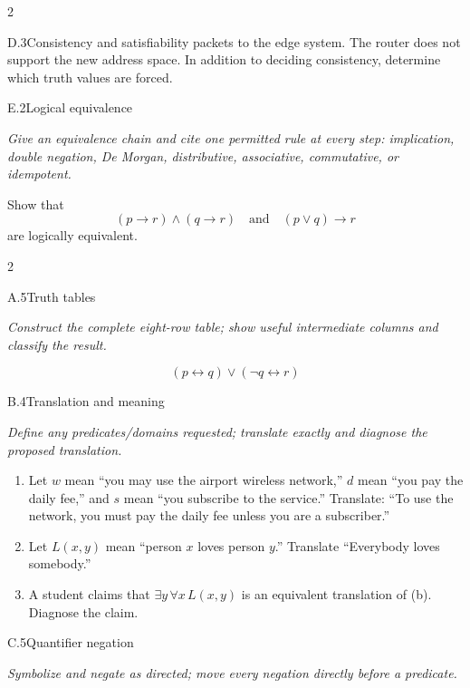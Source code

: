 \documentclass[9pt]{extarticle}
\begin{document}
\begin{multicols}{2}
\begin{CoreProblem}{D.3}{Consistency and satisfiability}
packets to the edge system. The router does not support the new address space.
In addition to deciding consistency, determine which truth values are forced.
\end{CoreProblem}
\begin{CoreProblem}{E.2}{Logical equivalence}
{\scriptsize\textit{Give an equivalence chain and cite one permitted rule at every step: implication, double negation, De Morgan, distributive, associative, commutative, or idempotent.}\par}
Show that
\[
  (p\to r)\land(q\to r)
  \quad\text{and}\quad
  (p\lor q)\to r
\]
are logically equivalent.
\end{CoreProblem}
\end{multicols}
\CoreWorkArea
\FormBreak
{}
\begin{multicols}{2}
\begin{CoreProblem}{A.5}{Truth tables}
{\scriptsize\textit{Construct the complete eight-row table; show useful intermediate columns and classify the result.}\par}
\[
  (p\leftrightarrow q)\lor(\neg q\leftrightarrow r)
\]
\end{CoreProblem}
\begin{CoreProblem}{B.4}{Translation and meaning}
{\scriptsize\textit{Define any predicates/domains requested; translate exactly and diagnose the proposed translation.}\par}
\begin{enumerate}[label=(\alph*)]
  \item Let $w$ mean ``you may use the airport wireless network,'' $d$ mean
        ``you pay the daily fee,'' and $s$ mean ``you subscribe to the
        service.'' Translate: ``To use the network, you must pay the daily fee
        unless you are a subscriber.''
  \item Let $L(x,y)$ mean ``person $x$ loves person $y$.'' Translate
        ``Everybody loves somebody.''
  \item A student claims that $\exists y\,\forall x\,L(x,y)$ is an equivalent
        translation of (b). Diagnose the claim.
\end{enumerate}
\end{CoreProblem}
\begin{CoreProblem}{C.5}{Quantifier negation}
{\scriptsize\textit{Symbolize and negate as directed; move every negation directly before a predicate.}\par}
\begin{enumerate}[label=(\alph*)]

\end{enumerate}
\end{CoreProblem}
\end{multicols}
\end{document}
